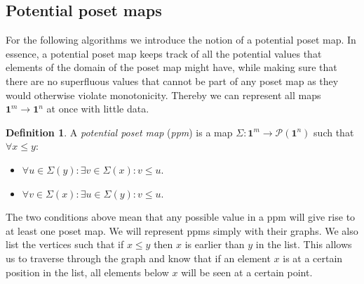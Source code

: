 \documentclass[11pt]{article}
\theoremstyle{definition}
\newtheorem{definition}{Definition}
\newcommand{\mname}[1]{\textit{{#1}}}
\newcommand{\pint}[1]{\mathbf{1}^{#1}}
\newcommand{\pintrestr}[3]{\mathbf{1}^{#1}_{{#2}={#3}}}
\newcommand{\restrict}[2]{{#1}|_{#2}}
\newcommand{\ctxtdim}[1]{|{#1}|}
\newcommand{\dmap}[2]{d^{({#1} , {#2})}}
\newcommand{\pow}[1]{\mathcal{P}({#1})}
\begin{document}





\subsection{Potential poset maps}
\label{ssec:ppm}

For the following algorithms we introduce the notion of a potential poset map. In
essence, a potential poset map keeps track of all the potential values that elements of
the domain of the poset map might have, while making sure that there are no
superfluous values that cannot be part of any poset map as they would otherwise
violate monotonicity. Thereby we can represent all maps $\pint{m} \to \pint{n}$
at once with little data.

\newpage
\begin{definition}

  A \mname{potential poset map} (\mname{ppm}) is a map $\Sigma : \pint{m} \to \pow{\pint{n}}$
  such that $\forall x \leq y$:
  \begin{itemize}
  \item $\forall u \in \Sigma(y) : \exists v \in \Sigma(x) : v \leq u$.
  \item $\forall v \in \Sigma(x) : \exists u \in \Sigma(y) : v \leq u$.
  \end{itemize}

\end{definition}

The two conditions above mean that any possible value in a ppm will give
rise to at least one poset map.
We will represent ppms simply with their graphs. We also
list the vertices such that if $x \leq y$ then $x$ is earlier than $y$ in the
list. This allows us to traverse through the graph and know that if an element
$x$ is at a certain position in the list, all elements below $x$ will be seen at
a certain point.
\end{document}
